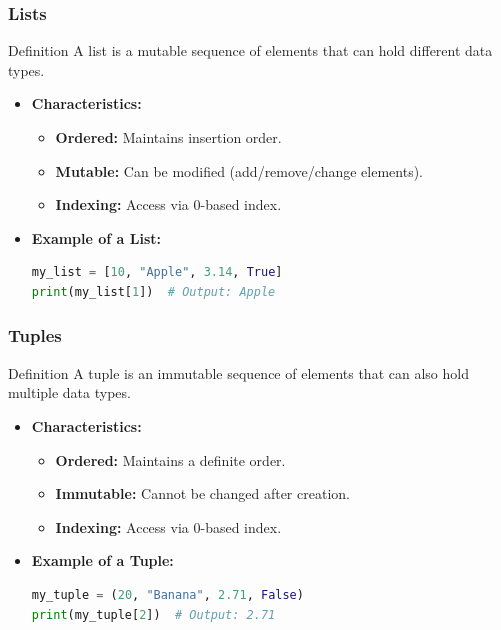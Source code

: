 \documentclass{beamer}
\begin{document}
\begin{frame}[fragile]
    \frametitle{Lists}
    \begin{block}{Definition}
        A list is a mutable sequence of elements that can hold different data types.
    \end{block}
    \begin{itemize}
        \item \textbf{Characteristics:}
            \begin{itemize}
                \item \textbf{Ordered:} Maintains insertion order.
                \item \textbf{Mutable:} Can be modified (add/remove/change elements).
                \item \textbf{Indexing:} Access via 0-based index.
            \end{itemize}
        \item \textbf{Example of a List:}
            \begin{lstlisting}[language=Python]
my_list = [10, "Apple", 3.14, True]
print(my_list[1])  # Output: Apple
            \end{lstlisting}
    \end{itemize}
\end{frame}

\begin{frame}[fragile]
    \frametitle{Tuples}
    \begin{block}{Definition}
        A tuple is an immutable sequence of elements that can also hold multiple data types.
    \end{block}
    \begin{itemize}
        \item \textbf{Characteristics:}
            \begin{itemize}
                \item \textbf{Ordered:} Maintains a definite order.
                \item \textbf{Immutable:} Cannot be changed after creation.
                \item \textbf{Indexing:} Access via 0-based index.
            \end{itemize}
        \item \textbf{Example of a Tuple:}
            \begin{lstlisting}[language=Python]
my_tuple = (20, "Banana", 2.71, False)
print(my_tuple[2])  # Output: 2.71
            \end{lstlisting}
    \end{itemize}
\end{frame}
\end{document}
